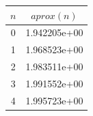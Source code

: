 \documentclass{article}
\begin{document}
\begin{tabularx}{400pt}{c|c}
 $n$ & $aprox(n)$ \\
\hline
 0 & 1.942205e+00 \\
 \hline 
 1 & 1.968523e+00 \\
 \hline 
 2 & 1.983511e+00 \\
 \hline 
 3 & 1.991552e+00 \\
 \hline 
 4 & 1.995723e+00 \\
 \hline 
\end{tabularx}
\end{document}
